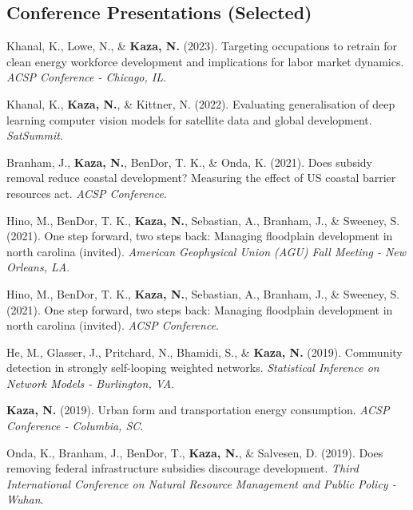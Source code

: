 \documentclass[11pt,a4paper,]{awesome-cv}
\newlength{\cslhangindent}
\newenvironment{CSLReferences}[2] %
 {\begin{list}{}{%
  \setlength{\itemindent}{0pt}
  \setlength{\leftmargin}{0pt}
  \setlength{\parsep}{0pt}
  \ifodd #1
   \setlength{\leftmargin}{\cslhangindent}
   \setlength{\itemindent}{-1\cslhangindent}
  \fi
  \setlength{\itemsep}{#2\baselineskip}}}
 {\end{list}}
\begin{document}
\subsection{Conference Presentations
(Selected)}\label{conference-presentations-selected}

\label{refs-fb15afc63fa9eb1374774a7e00e9a355}
\begin{CSLReferences}{1}{0}
Khanal, K., Lowe, N., \& \textbf{Kaza, N.} (2023). Targeting occupations
to retrain for clean energy workforce development and implications for
labor market dynamics. \emph{ACSP Conference - Chicago, IL}.

Khanal, K., \textbf{Kaza, N.}, \& Kittner, N. (2022). Evaluating
generalisation of deep learning computer vision models for satellite
data and global development. \emph{SatSummit}.

Branham, J., \textbf{Kaza, N.}, BenDor, T. K., \& Onda, K. (2021). Does
subsidy removal reduce coastal development? Measuring the effect of US
coastal barrier resources act. \emph{ACSP Conference}.

Hino, M., BenDor, T. K., \textbf{Kaza, N.}, Sebastian, A., Branham, J.,
\& Sweeney, S. (2021). One step forward, two steps back: Managing
floodplain development in north carolina (invited). \emph{American
Geophysical Union (AGU) Fall Meeting - New Orleans, LA}.

Hino, M., BenDor, T. K., \textbf{Kaza, N.}, Sebastian, A., Branham, J.,
\& Sweeney, S. (2021). One step forward, two steps back: Managing
floodplain development in north carolina (invited). \emph{ACSP
Conference}.

He, M., Glasser, J., Pritchard, N., Bhamidi, S., \& \textbf{Kaza, N.}
(2019). Community detection in strongly self-looping weighted networks.
\emph{Statistical Inference on Network Models - Burlington, VA}.

\textbf{Kaza, N.} (2019). Urban form and transportation energy
consumption. \emph{ACSP Conference - Columbia, SC}.

Onda, K., Branham, J., BenDor, T., \textbf{Kaza, N.}, \& Salvesen, D.
(2019). Does removing federal infrastructure subsidies discourage
development. \emph{Third International Conference on Natural Resource
Management and Public Policy - Wuhan}.


\end{CSLReferences}
\end{document}
